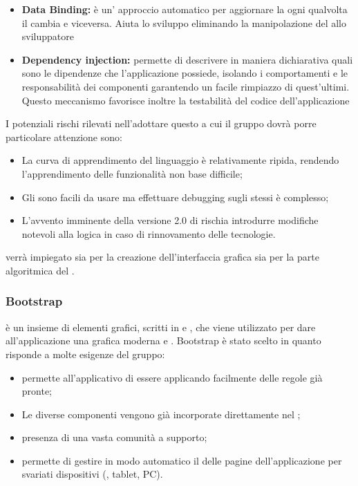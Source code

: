 \documentclass[12pt,a4paper]{article}
\begin{document}
\begin{itemize}
	\item \textbf{Data Binding:} è un’ approccio automatico per aggiornare la  ogni qualvolta il  cambia e viceversa. Aiuta lo sviluppo eliminando la manipolazione del  allo sviluppatore
	\item \textbf{Dependency injection:} permette di descrivere in maniera dichiarativa quali sono le
	dipendenze che l’applicazione possiede, isolando i comportamenti e le responsabilità dei componenti garantendo un facile rimpiazzo di quest’ultimi. Questo meccanismo favorisce inoltre la testabilità del codice dell’applicazione	
\end{itemize}
I potenziali rischi rilevati nell'adottare questo  a cui il gruppo dovrà porre particolare attenzione sono:
\begin{itemize}
	\item La curva di apprendimento del linguaggio è relativamente ripida, rendendo l'apprendimento delle funzionalità non base difficile;
	\item Gli  sono facili da usare ma effettuare debugging sugli stessi è complesso;
	\item L'avvento imminente della versione 2.0 di  rischia introdurre modifiche notevoli alla logica  in caso di rinnovamento delle tecnologie.
\end{itemize}
 verrà impiegato sia per la creazione dell’interfaccia grafica sia per la parte algoritmica del .

\subsubsection{Bootstrap}\label{bootstrap}
 è un insieme di elementi grafici, scritti in  e , che viene utilizzato per dare all'applicazione una grafica moderna e . Bootstrap è stato scelto in quanto risponde a molte esigenze del gruppo:

\begin{itemize}
	\item permette all’applicativo di essere  applicando facilmente delle regole già pronte;
	\item Le diverse componenti vengono già incorporate direttamente nel  ;
	\item presenza di una vasta comunità a supporto;
	\item permette di gestire in modo automatico il  delle pagine dell'applicazione per svariati dispositivi (, tablet, PC).
\end{itemize}
\end{document}
